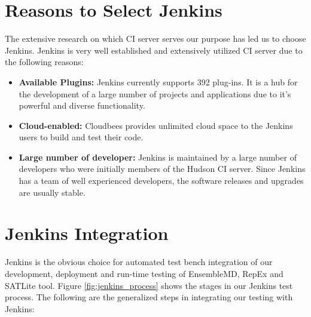 \documentclass[10pt]{ruthesis}
\begin{document}

\section{Reasons to Select Jenkins}
The extensive research on which CI server serves our purpose has led us to choose Jenkins. Jenkins is very well established and extensively utilized CI server due to the following reasons:

\begin{itemize}
\item \textbf{Available Plugins:} Jenkins currently supports 392 plug-ins. It is a hub for the development of a large number of projects and applications due to it's powerful and diverse functionality.

\item \textbf{Cloud-enabled:} Cloudbees provides unlimited cloud space to the Jenkins users to build and test their code.

\item \textbf{Large number of developer:} Jenkins is maintained by a large number of developers who were initially members of the Hudson CI server. Since Jenkins has a team of well experienced developers, the software releases and upgrades are usually stable.
\end{itemize}

\section{Jenkins Integration}
Jenkins is the obvious choice for automated test bench integration of our development, deployment and run-time testing of EnsembleMD, RepEx and SATLite tool. Figure \ref{fig:jenkins_process} shows the stages in our Jenkins test process. The following are the generalized steps in integrating our testing with Jenkins:
\end{document}
